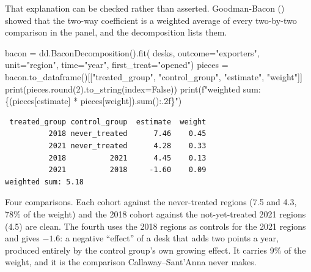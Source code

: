 \documentclass[
  letterpaper,
  10pt,
  twoside,
  openright,
  numbers=noenddot,
  chapterprefix=true]{scrbook}
\newenvironment{Shaded}{}{}
\newcommand{\BuiltInTok}[1]{\textcolor[rgb]{0.84,0.23,0.29}{#1}}
\newcommand{\DecValTok}[1]{\textcolor[rgb]{0.00,0.36,0.77}{#1}}
\newcommand{\NormalTok}[1]{\textcolor[rgb]{0.14,0.16,0.18}{#1}}
\newcommand{\OperatorTok}[1]{\textcolor[rgb]{0.14,0.16,0.18}{#1}}
\newcommand{\SpecialCharTok}[1]{\textcolor[rgb]{0.00,0.36,0.77}{#1}}
\newcommand{\SpecialStringTok}[1]{\textcolor[rgb]{0.01,0.18,0.38}{#1}}
\newcommand{\StringTok}[1]{\textcolor[rgb]{0.01,0.18,0.38}{#1}}
\newcommand{\VariableTok}[1]{\textcolor[rgb]{0.89,0.38,0.04}{#1}}
\begin{document}
That explanation can be checked rather than asserted. Goodman-Bacon
() showed that the two-way
coefficient is a weighted average of every two-by-two comparison in the
panel, and the decomposition lists them.

\label{check-desks-bacon}
\begin{Shaded}
\begin{Highlighting}[]
\NormalTok{bacon }\OperatorTok{=}\NormalTok{ dd.BaconDecomposition().fit(}
\NormalTok{    desks, outcome}\OperatorTok{=}\StringTok{"exporters"}\NormalTok{, unit}\OperatorTok{=}\StringTok{"region"}\NormalTok{, time}\OperatorTok{=}\StringTok{"year"}\NormalTok{, first\_treat}\OperatorTok{=}\StringTok{"opened"}\NormalTok{)}
\NormalTok{pieces }\OperatorTok{=}\NormalTok{ bacon.to\_dataframe()[[}\StringTok{"treated\_group"}\NormalTok{, }\StringTok{"control\_group"}\NormalTok{, }\StringTok{"estimate"}\NormalTok{, }\StringTok{"weight"}\NormalTok{]]}
\BuiltInTok{print}\NormalTok{(pieces.}\BuiltInTok{round}\NormalTok{(}\DecValTok{2}\NormalTok{).to\_string(index}\OperatorTok{=}\VariableTok{False}\NormalTok{))}
\BuiltInTok{print}\NormalTok{(}\SpecialStringTok{f"weighted sum: }\SpecialCharTok{\{}\NormalTok{(pieces[}\StringTok{\textquotesingle{}estimate\textquotesingle{}}\NormalTok{] }\OperatorTok{*}\NormalTok{ pieces[}\StringTok{\textquotesingle{}weight\textquotesingle{}}\NormalTok{])}\SpecialCharTok{.}\BuiltInTok{sum}\NormalTok{()}\SpecialCharTok{:.2f\}}\SpecialStringTok{"}\NormalTok{)}
\end{Highlighting}
\end{Shaded}

\begin{verbatim}
 treated_group control_group  estimate  weight
          2018 never_treated      7.46    0.45
          2021 never_treated      4.28    0.33
          2018          2021      4.45    0.13
          2021          2018     -1.60    0.09
weighted sum: 5.18
\end{verbatim}

Four comparisons. Each cohort against the never-treated regions (7.5 and
4.3, 78\% of the weight) and the 2018 cohort against the not-yet-treated
2021 regions (4.5) are clean. The fourth uses the 2018 regions as
controls for the 2021 regions and gives \(-1.6\): a negative ``effect''
of a desk that adds two points a year, produced entirely by the control
group's own growing effect. It carries 9\% of the weight, and it is the
comparison Callaway--Sant'Anna never makes.
\end{document}
